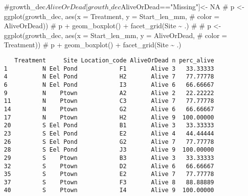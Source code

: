 \documentclass[
  letterpaper,
  DIV=11,
  numbers=noendperiod]{scrartcl}
\newenvironment{Shaded}{\begin{snugshade}}{\end{snugshade}}
\newcommand{\CommentTok}[1]{\textcolor[rgb]{0.37,0.37,0.37}{#1}}
\newcommand{\DecValTok}[1]{\textcolor[rgb]{0.68,0.00,0.00}{#1}}
\newcommand{\FunctionTok}[1]{\textcolor[rgb]{0.28,0.35,0.67}{#1}}
\newcommand{\NormalTok}[1]{\textcolor[rgb]{0.00,0.23,0.31}{#1}}
\newcommand{\OtherTok}[1]{\textcolor[rgb]{0.00,0.23,0.31}{#1}}
\newcommand{\SpecialCharTok}[1]{\textcolor[rgb]{0.37,0.37,0.37}{#1}}
\newcommand{\StringTok}[1]{\textcolor[rgb]{0.13,0.47,0.30}{#1}}
\begin{document}
\begin{Shaded}
\begin{Highlighting}[]
\CommentTok{\#growth\_dec$AliveOrDead[growth\_dec$AliveOrDead=="Missing"]\textless{}{-} NA}
\CommentTok{\# p \textless{}{-} ggplot(growth\_dec, aes(x = Treatment, y = Start\_len\_mm, }
\CommentTok{\#                             color = AliveOrDead))}
\CommentTok{\# p + geom\_boxplot() + facet\_grid(Site \textasciitilde{} .)}
\CommentTok{\# }
\CommentTok{\# p \textless{}{-} ggplot(growth\_dec, aes(x = Start\_len\_mm, y = AliveOrDead, }
\CommentTok{\#                             color = Treatment))}
\CommentTok{\# p + geom\_boxplot() + facet\_grid(Site \textasciitilde{} .)}
\end{Highlighting}
\end{Shaded}

\begin{Shaded}
\end{Shaded}

\begin{verbatim}
   Treatment     Site Location_code AliveOrDead n perc_alive
1          N Eel Pond            F1       Alive 3   33.33333
4          N Eel Pond            H2       Alive 7   77.77778
6          N Eel Pond            I3       Alive 6   66.66667
9          N    Ptown            A2       Alive 2   22.22222
11         N    Ptown            C3       Alive 7   77.77778
14         N    Ptown            G2       Alive 6   66.66667
17         N    Ptown            H2       Alive 9  100.00000
20         S Eel Pond            B1       Alive 3   33.33333
23         S Eel Pond            E2       Alive 4   44.44444
26         S Eel Pond            G2       Alive 7   77.77778
28         S Eel Pond            J3       Alive 9  100.00000
29         S    Ptown            B3       Alive 3   33.33333
32         S    Ptown            D2       Alive 6   66.66667
35         S    Ptown            E2       Alive 7   77.77778
37         S    Ptown            F3       Alive 8   88.88889
40         S    Ptown            I4       Alive 9  100.00000
\end{verbatim}
\end{document}

